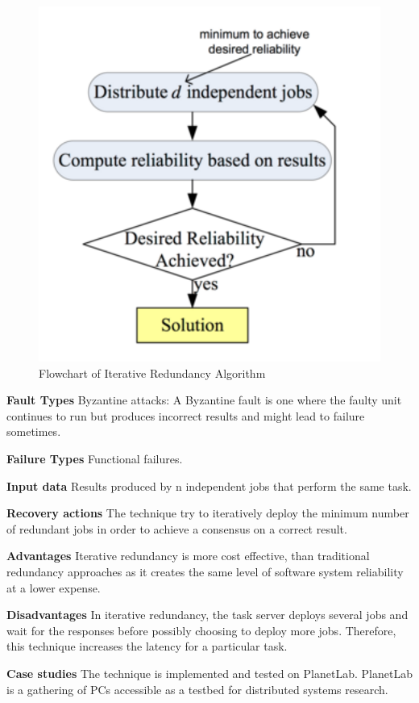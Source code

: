 \begin{compactitem}
\begin{figure}[H]
\center
\includegraphics[width=5in]{img/Iterativeredundancyschematic}
\caption{Flowchart of Iterative Redundancy Algorithm}
\end{figure}


\item[\textbf{Fault Types}]Byzantine attacks: A Byzantine fault is one where the faulty unit continues to run but produces incorrect results and might lead to failure sometimes. 

\item[\textbf{Failure Types}]Functional failures.

\item[\textbf{Input data}] Results produced by n independent jobs that perform the same task.

\item[\textbf{Recovery actions}]The technique try to  iteratively deploy the minimum number of redundant jobs in order to achieve a consensus on a correct result.

\item[\textbf{Advantages}] Iterative redundancy is more cost effective, than traditional redundancy approaches as it creates the same level of software system reliability at a lower expense.

\item[\textbf{Disadvantages}] In iterative redundancy, the task server deploys several jobs and wait for the responses before possibly choosing to deploy more jobs. Therefore, this technique increases the latency for a particular task.

\item[\textbf{Case studies}]
The technique is implemented and tested on PlanetLab. PlanetLab is a gathering of PCs accessible as a testbed for distributed systems research.\\
\end{compactitem}


